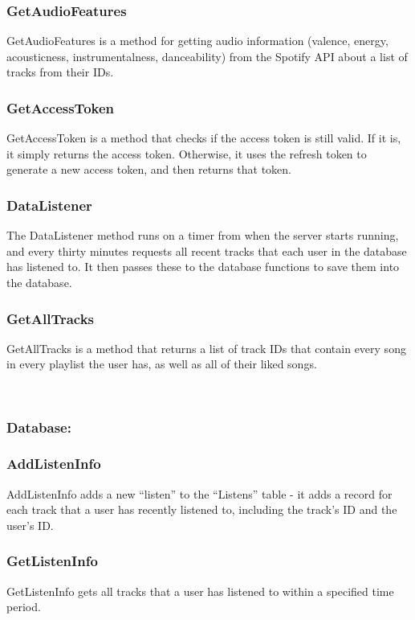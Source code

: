 \documentclass[11pt]{report}
\begin{document}
\subsubsection{GetAudioFeatures}
GetAudioFeatures is a method for getting audio information (valence, energy, acousticness, instrumentalness, danceability) from the Spotify API about a list of tracks from their IDs.

\subsubsection{GetAccessToken}
GetAccessToken is a method that checks if the access token is still valid. If it is, it simply returns the access token. Otherwise, it uses the refresh token to generate a new access token, and then returns that token.

\subsubsection{DataListener}
The DataListener method runs on a timer from when the server starts running, and every thirty minutes requests all recent tracks that each user in the database has listened to. It then passes these to the database functions to save them into the database.

\subsubsection{GetAllTracks}
GetAllTracks is a method that returns a list of track IDs that contain every song in every playlist the user has, as well as all of their liked songs.

\leavevmode \\

\subsubsection{Database:}

\hrulefill

\subsubsection{AddListenInfo}
AddListenInfo adds a new “listen” to the “Listens” table - it adds a record for each track that a user has recently listened to, including the track’s ID and the user’s ID.

\subsubsection{GetListenInfo}
GetListenInfo gets all tracks that a user has listened to within a specified time period.
\end{document}
